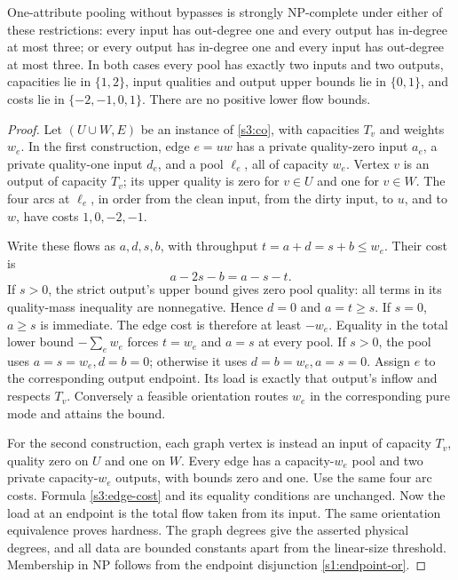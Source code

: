 \begin{theorem}\label{s3:local-degrees}
One-attribute pooling without bypasses is strongly NP-complete under either
of these restrictions: every input has out-degree one and every output
has in-degree at most three; or every output has in-degree one and every
input has out-degree at most three. In both cases every pool has exactly
two inputs and two outputs, capacities lie in $\{1,2\}$, input qualities
and output upper bounds lie in $\{0,1\}$, and costs lie in
$\{-2,-1,0,1\}$. There are no positive lower flow bounds.
\end{theorem}
\begin{proof}
Let $(U\cup W,E)$ be an instance of \cref{s3:co}, with capacities $T_v$
and weights $w_e$. In the first construction, edge $e=uw$ has a private
quality-zero input $a_e$, a private quality-one input $d_e$, and a pool
$\ell_e$, all of capacity $w_e$. Vertex $v$ is an output of capacity
$T_v$; its upper quality is zero for $v\in U$ and one for $v\in W$.
The four arcs at $\ell_e$, in order from the clean input, from the dirty
input, to $u$, and to $w$, have costs $1,0,-2,-1$.

Write these flows as $a,d,s,b$, with throughput
$t=a+d=s+b\le w_e$. Their cost is
\begin{equation}
 a-2s-b=a-s-t.\label{s3:edge-cost}
\end{equation}
If $s>0$, the strict output's upper bound gives zero pool quality:
all terms in its quality-mass inequality are nonnegative. Hence $d=0$
and $a=t\ge s$. If $s=0$, $a\ge s$ is immediate. The edge cost is
therefore at least $-w_e$. Equality in the total lower bound
$-\sum_e w_e$ forces $t=w_e$ and $a=s$ at every pool. If $s>0$, the
pool uses $a=s=w_e,d=b=0$; otherwise it uses $d=b=w_e,a=s=0$.
Assign $e$ to the corresponding output endpoint. Its load is exactly
that output's inflow and respects $T_v$. Conversely a feasible orientation
routes $w_e$ in the corresponding pure mode and attains the bound.

For the second construction, each graph vertex is instead an input of
capacity $T_v$, quality zero on $U$ and one on $W$. Every edge has a
capacity-$w_e$ pool and two private capacity-$w_e$ outputs, with bounds
zero and one. Use the same four arc costs. Formula \eqref{s3:edge-cost}
and its equality conditions are unchanged. Now the load at an endpoint
is the total flow taken from its input. The same orientation equivalence
proves hardness. The graph degrees give the asserted physical degrees,
and all data are bounded constants apart from the linear-size threshold.
Membership in NP follows from the endpoint disjunction
\eqref{s1:endpoint-or}.
\end{proof}


